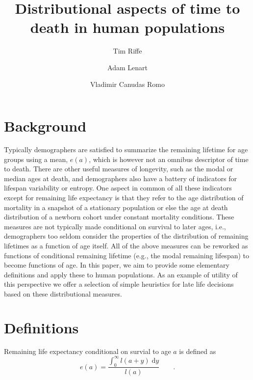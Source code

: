 \documentclass{article}
\newcommand{\dd}{\; \mathrm{d}}
\newcommand{\tp}{\quad\quad\text{.}}
\begin{document}
\title{Distributional aspects of time to death in human populations}

\author[1]{Tim Riffe}
\author[2,3]{Adam Lenart}
\author[2,3]{Vladimir Canudas Romo}


\maketitle

\section*{Background}

Typically demographers are satisfied to summarize the remaining lifetime for age
groups using a mean, $e(a)$, which is however not an omnibus descriptor of time
to death. There are other useful measures of longevity, such as
the modal or median ages at death, and demographers also have a battery of
indicators for lifespan variability or entropy. One aspect in common of all
these indicators except for remaining life expectancy is that they refer to the
age distribution of mortality in a snapshot of a stationary population or else
the age at death distribution of a newborn cohort under constant mortality
conditions. These measures are not typically made conditional on survival to
later ages, i.e., demographers too seldom consider the properties of the
distribution of remaining lifetimes as a function of age itself. All of
the above measures can be reworked as functions of conditional remaining
lifetime (e.g., the modal remaining lifespan) to become functions of age.
In this paper, we aim to provide some elementary definitions and
apply these to human populations. As an example of utility of this perspective we offer a
selection of simple heuristics for late life decisions based on these
distributional measures.

\section*{Definitions}

Remaining life expectancy conditional on survial to age $a$ is defined as
\begin{equation}
e(a) = \frac{\int_0^\infty l(a+y) \dd y}{l(a)} \tp
\end{equation}
\end{document}
